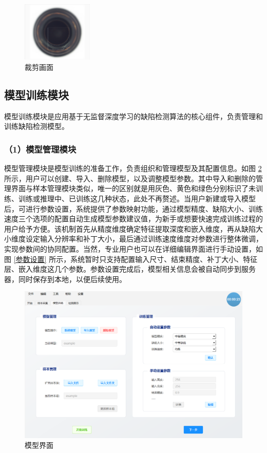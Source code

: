 \documentclass[
  ]{njuthesis}
\begin{document}
\begin{figure}[htb]
    \centering
    \includegraphics[width=0.3\textwidth]{images/裁剪画面.png}
    \caption{裁剪画面}
    \label{裁剪画面}
\end{figure}

\subsection{模型训练模块}

模型训练模块是应用基于无监督深度学习的缺陷检测算法的核心组件，负责管理和训练缺陷检测模型。

\subsubsection{（1）模型管理模块}

模型管理模块是模型训练的准备工作，负责组织和管理模型及其配置信息。如图 \ref{模型界面} 所示，用户可以创建、导入、删除模型，以及调整模型参数。其中导入和删除的管理界面与样本管理模块类似，唯一的区别就是用灰色、黄色和绿色分别标识了未训练、训练或推理中、已训练这几种状态，此处不再赘述。当用户新建或导入模型后，可进行参数设置，系统提供了参数映射功能，通过模型精度、缺陷大小、训练速度三个选项的配置自动生成模型参数建议值，为新手或想要快速完成训练过程的用户给予方便。该机制首先从精度维度确定特征提取深度和嵌入维度，再从缺陷大小维度设定输入分辨率和补丁大小，最后通过训练速度维度对参数进行整体微调，实现参数间的协同配置。当然，专业用户也可以在详细编辑界面进行手动设置，如图 \ref{参数设置} 所示，系统暂时只支持配置输入尺寸、结束精度、补丁大小、特征层、嵌入维度这几个参数。参数设置完成后，模型相关信息会被自动同步到服务器，同时保存到本地，以便后续使用。

\begin{figure}[H]
    \centering
    \includegraphics[width=\textwidth]{images/模型界面.png}
    \caption{模型界面}
    \label{模型界面}
\end{figure}
\end{document}
